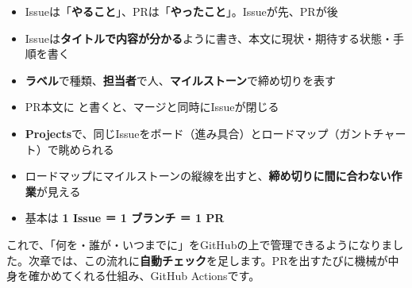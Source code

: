 \begin{itemize}[leftmargin=1.4em]
  \item Issueは「\textbf{やること}」、PRは「\textbf{やったこと}」。Issueが先、PRが後
  \item Issueは\textbf{タイトルで内容が分かる}ように書き、本文に現状・期待する状態・手順を書く
  \item \textbf{ラベル}で種類、\textbf{担当者}で人、\textbf{マイルストーン}で締め切りを表す
  \item PR本文に \textbf{} と書くと、マージと同時にIssueが閉じる
  \item \textbf{Projects}で、同じIssueをボード（進み具合）とロードマップ（ガントチャート）で眺められる
  \item ロードマップにマイルストーンの縦線を出すと、\textbf{締め切りに間に合わない作業}が見える
  \item 基本は \textbf{1 Issue ＝ 1 ブランチ ＝ 1 PR}
\end{itemize}

これで、「何を・誰が・いつまでに」をGitHubの上で管理できるようになりました。次章では、この流れに\textbf{自動チェック}を足します。PRを出すたびに機械が中身を確かめてくれる仕組み、GitHub Actionsです。
